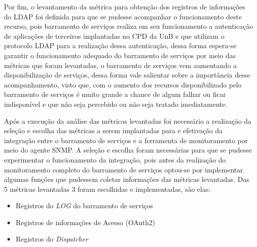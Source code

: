 Por fim, o levantamento da métrica para obtenção dos registros de informações do LDAP foi definida para que se pudesse acompanhar o funcionamento deste recurso, pois barramento de serviços realiza em seu funcionamento a autenticação de aplicações de terceiros implantadas no CPD da UnB e que utilizam o protocolo LDAP para a realização dessa autenticação, dessa forma espera-se garantir o funcionamento adequado do barramento de serviços por meio das métricas que foram levantadas, o barramento de serviços vem aumentando a disponibilização de serviços, dessa forma vale salientar sobre a importância desse acompanhamento, visto que, com o aumento dos recursos disponibilizado pelo barramento de serviços é muito grande a chance de algum falhar ou ficar indisponível e que não seja percebido ou não seja tratado imediatamente.  

Após a execução da análise das métricas levantadas foi necessário a realização da seleção e escolha das métricas a serem implantadas para e efetivação da integração entre o barramento de serviços e a ferramenta de monitoramento por meio do agente \acrshort{SNMP}. A seleção e escolha foram necessárias para que se pudesse experimentar o funcionamento da integração, pois antes da realização do monitoramento completo do barramento de serviços optou-se por implementar algumas funções que pudessem coletar informações das métricas levantadas. Das 5 métricas levantadas 3 foram escolhidas e implementadas, são elas: 

\begin{itemize}
    \item Registros do \textit{LOG} do barramento de serviços
    \item Registros de informações de Acesso (OAuth2)
    \item Registros do \textit{Dispatcher}
\end{itemize}

